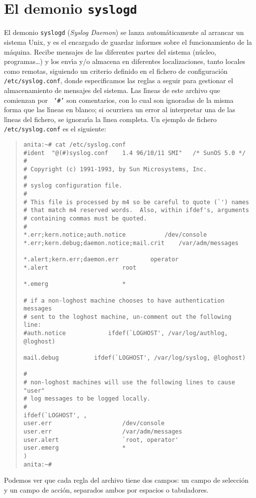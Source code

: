 \section{El demonio {\tt syslogd}}
El demonio {\tt syslogd} ({\it Syslog Daemon}) se lanza autom\'aticamente al
arrancar un sistema Unix, y es el encargado de guardar
informes sobre el funcionamiento de la m\'aquina. Recibe mensajes de las
diferentes partes del sistema (n\'ucleo, programas\ldots ) y los env\'{\i}a
y/o almacena en diferentes localizaciones, tanto locales como remotas, siguiendo
un criterio definido en el fichero de configuraci\'on {\tt /etc/syslog.conf}, 
donde especificamos las reglas a seguir para gestionar el almacenamiento de 
mensajes del sistema. Las l\'{\i}neas de este archivo que comienzan por {\tt 
`\#'} son comentarios, con lo cual son ignoradas de la misma forma que las 
l\'{\i}neas en blanco; si ocurriera un error al interpretar una de las 
l\'{\i}neas del fichero, se ignorar\'{\i}a la l\'{\i}nea completa. Un ejemplo
de fichero {\tt /etc/syslog.conf} es el siguiente:
\begin{quote}
\begin{verbatim}
anita:~# cat /etc/syslog.conf
#ident	"@(#)syslog.conf	1.4	96/10/11 SMI"	/* SunOS 5.0 */
#
# Copyright (c) 1991-1993, by Sun Microsystems, Inc.
#
# syslog configuration file.
#
# This file is processed by m4 so be careful to quote (`') names
# that match m4 reserved words.  Also, within ifdef's, arguments
# containing commas must be quoted.
#
*.err;kern.notice;auth.notice			/dev/console
*.err;kern.debug;daemon.notice;mail.crit	/var/adm/messages

*.alert;kern.err;daemon.err			operator
*.alert						root

*.emerg						*

# if a non-loghost machine chooses to have authentication messages
# sent to the loghost machine, un-comment out the following line:
#auth.notice			ifdef(`LOGHOST', /var/log/authlog, @loghost)

mail.debug			ifdef(`LOGHOST', /var/log/syslog, @loghost)

#
# non-loghost machines will use the following lines to cause "user"
# log messages to be logged locally.
#
ifdef(`LOGHOST', ,
user.err					/dev/console
user.err					/var/adm/messages
user.alert					`root, operator'
user.emerg					*
)
anita:~#
\end{verbatim}
\end{quote}
Podemos ver que cada regla del archivo tiene dos campos: un campo de 
selecci\'on y un campo de acci\'on, separados ambos por espacios o tabuladores. 
